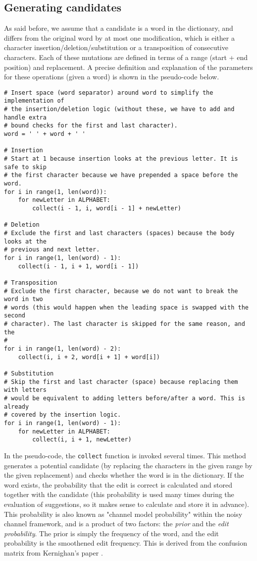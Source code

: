 \documentclass[11pt,a4paper]{article}
\begin{document}
\subsection{Generating candidates}\label{generateCandidateWords}
As said before, we assume that a candidate is a word in the dictionary, and differs from the original word by at most one modification, which is either a character insertion/deletion/substitution or a transposition of consecutive characters.
Each of these mutations are defined in terms of a range (start + end position) and replacement.
A precise definition and explanation of the parameters for these operations (given a word) is shown in the pseudo-code below.

\begin{lstlisting}
# Insert space (word separator) around word to simplify the implementation of
# the insertion/deletion logic (without these, we have to add and handle extra
# bound checks for the first and last character).
word = ' ' + word + ' '

# Insertion
# Start at 1 because insertion looks at the previous letter. It is safe to skip
# the first character because we have prepended a space before the word.
for i in range(1, len(word)):
    for newLetter in ALPHABET:
        collect(i - 1, i, word[i - 1] + newLetter)

# Deletion
# Exclude the first and last characters (spaces) because the body looks at the
# previous and next letter.
for i in range(1, len(word) - 1):
    collect(i - 1, i + 1, word[i - 1])

# Transposition
# Exclude the first character, because we do not want to break the word in two
# words (this would happen when the leading space is swapped with the second
# character). The last character is skipped for the same reason, and the
# 
for i in range(1, len(word) - 2):
    collect(i, i + 2, word[i + 1] + word[i])

# Substitution
# Skip the first and last character (space) because replacing them with letters
# would be equivalent to adding letters before/after a word. This is already
# covered by the insertion logic.
for i in range(1, len(word) - 1):
    for newLetter in ALPHABET:
        collect(i, i + 1, newLetter)
\end{lstlisting}

In the pseudo-code, the \texttt{collect} function is invoked several times.
This method generates a potential candidate (by replacing the characters in the given range by the given replacement) and checks whether the word is in the dictionary.
If the word exists, the probability that the edit is correct is calculated and stored together with the candidate (this probability is used many times during the evaluation of suggestions, so it makes sense to calculate and store it in advance).
This probability is also known as "channel model probability" within the noisy channel framework, and is a product of two factors: the \textit{prior} and the \textit{edit probability}.
The prior is simply the frequency of the word, and the edit probability is the smoothened edit frequency. This is derived from the confusion matrix from Kernighan's paper \cite{kernighan}.
\end{document}
